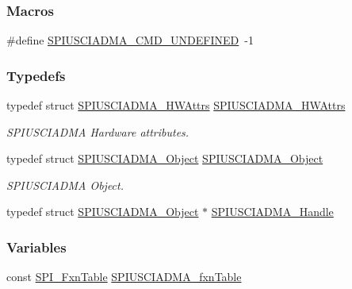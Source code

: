 \subsubsection*{Macros}
\begin{DoxyCompactItemize}
\item 
\#define \hyperlink{_s_p_i_u_s_c_i_a_d_m_a_8h_a4d4521e9ab812d49ec8cea9e335eea19}{S\-P\-I\-U\-S\-C\-I\-A\-D\-M\-A\-\_\-\-C\-M\-D\-\_\-\-U\-N\-D\-E\-F\-I\-N\-E\-D}~-\/1
\end{DoxyCompactItemize}
\subsubsection*{Typedefs}
\begin{DoxyCompactItemize}
\item 
typedef struct \hyperlink{struct_s_p_i_u_s_c_i_a_d_m_a___h_w_attrs}{S\-P\-I\-U\-S\-C\-I\-A\-D\-M\-A\-\_\-\-H\-W\-Attrs} \hyperlink{_s_p_i_u_s_c_i_a_d_m_a_8h_a36eab8cb3bdf2310f5ab1f66a0e12e7a}{S\-P\-I\-U\-S\-C\-I\-A\-D\-M\-A\-\_\-\-H\-W\-Attrs}
\begin{DoxyCompactList}\small\item\em S\-P\-I\-U\-S\-C\-I\-A\-D\-M\-A Hardware attributes. \end{DoxyCompactList}\item 
typedef struct \hyperlink{struct_s_p_i_u_s_c_i_a_d_m_a___object}{S\-P\-I\-U\-S\-C\-I\-A\-D\-M\-A\-\_\-\-Object} \hyperlink{_s_p_i_u_s_c_i_a_d_m_a_8h_add524b2585b8b4aaaede70d3f0356c9d}{S\-P\-I\-U\-S\-C\-I\-A\-D\-M\-A\-\_\-\-Object}
\begin{DoxyCompactList}\small\item\em S\-P\-I\-U\-S\-C\-I\-A\-D\-M\-A Object. \end{DoxyCompactList}\item 
typedef struct \hyperlink{struct_s_p_i_u_s_c_i_a_d_m_a___object}{S\-P\-I\-U\-S\-C\-I\-A\-D\-M\-A\-\_\-\-Object} $\ast$ \hyperlink{_s_p_i_u_s_c_i_a_d_m_a_8h_a4bf7edb9d6368c9d51b97e4733c1dcb3}{S\-P\-I\-U\-S\-C\-I\-A\-D\-M\-A\-\_\-\-Handle}
\end{DoxyCompactItemize}
\subsubsection*{Variables}
\begin{DoxyCompactItemize}
\item 
const \hyperlink{struct_s_p_i___fxn_table}{S\-P\-I\-\_\-\-Fxn\-Table} \hyperlink{_s_p_i_u_s_c_i_a_d_m_a_8h_abb113a7efbb267a0b876ffaf4c68cd89}{S\-P\-I\-U\-S\-C\-I\-A\-D\-M\-A\-\_\-fxn\-Table}
\end{DoxyCompactItemize}


